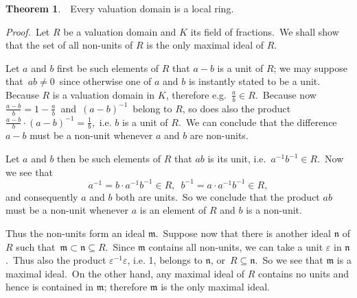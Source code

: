 \documentclass[12pt]{article}
\theoremstyle{definition}
\newtheorem*{thmplain}{Theorem}
\begin{document}
\begin{thmplain}
\, \,Every valuation domain is a local ring.
\end{thmplain}

{\em Proof.} \,Let $R$ be a valuation domain and $K$ its field of fractions. \,We shall show that the set of all non-units of $R$ is the only maximal ideal of $R$.

Let $a$ and $b$ first be such elements of $R$ that $a-b$ is a unit of $R$; we may suppose that \,$ab \neq 0$\, since otherwise one of $a$ and $b$ is instantly stated to be a unit. \,Because $R$ is a valuation domain in $K$, therefore e.g. \,$\frac{a}{b}\in R$. \,Because now \,$\frac{a-b}{b} = 1-\frac{a}{b}$\, and \,$(a-b)^{-1}$\, belong to $R$, so does also the product \,$\frac{a-b}{b}\cdot(a-b)^{-1} = \frac{1}{b}$, \,i.e. $b$ is a unit of $R$. \,We can conclude that the difference $a-b$ must be a non-unit whenever $a$ and $b$ are non-units.

Let $a$ and $b$ then be such elements of $R$ that $ab$ is its unit, i.e. \,$a^{-1}b^{-1}\in R$. \,Now we see that
 $$a^{-1} = b\cdot a^{-1}b^{-1}\in R,\,\,\,b^{-1} = a\cdot a^{-1}b^{-1}\in R ,$$
and consequently $a$ and $b$ both are units. \,So we conclude that the product $ab$ must be a non-unit whenever $a$ is an element of $R$ and $b$ is a non-unit.

Thus the non-units form an ideal $\mathfrak{m}$. \,Suppose now that there is another ideal $\mathfrak{n}$ of $R$ such that \,$\mathfrak{m}\subset\mathfrak{n}\subseteq R$. \,Since $\mathfrak{m}$ contains all non-units, we can take a unit $\varepsilon$ in $\mathfrak{n}$. \,Thus also the product $\varepsilon^{-1}\varepsilon$, i.e. 1, belongs to $\mathfrak{n}$, or \,$R\subseteq\mathfrak{n}$. \,So we see that $\mathfrak{m}$ is a maximal ideal. \,On the other hand, any maximal ideal of $R$ contains no units and hence is contained in $\mathfrak{m}$; therefore $\mathfrak{m}$ is the only maximal ideal.
\end{document}
